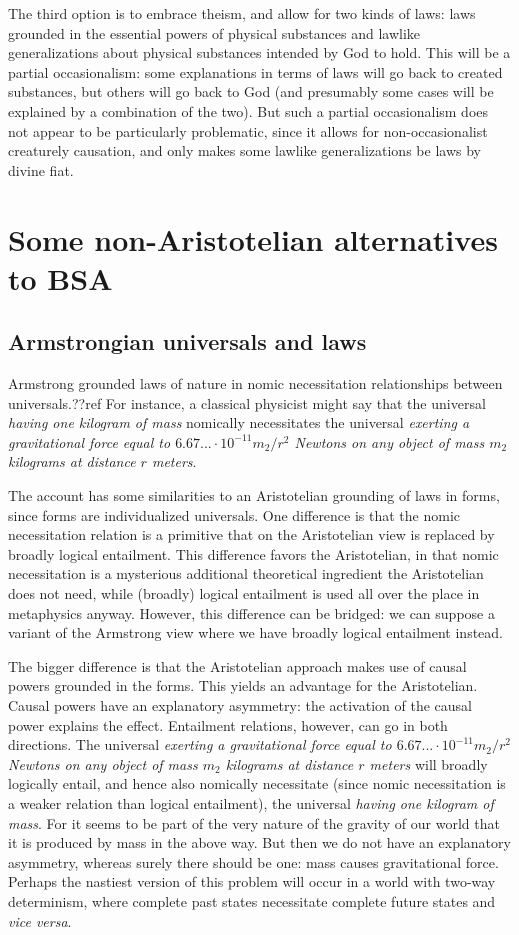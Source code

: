 The third option is to embrace theism, and allow for two kinds of laws: laws grounded in the essential powers of physical substances
and lawlike generalizations about physical substances intended by God to hold. This will be a partial occasionalism: some explanations
in terms of laws will go back to created substances, but others will go back to God (and presumably some cases will be explained by
a combination of the two). But such a partial occasionalism does not appear to be particularly problematic, since it
allows for non-occasionalist creaturely causation, and only makes some lawlike generalizations be laws by divine
fiat.

\section{Some non-Aristotelian alternatives to BSA}
\subsection{Armstrongian universals and laws}
Armstrong grounded laws of nature in nomic necessitation relationships between universals.??ref For instance, 
a classical physicist might say that the universal
\textit{having one kilogram of mass} nomically necessitates the universal \textit{exerting a gravitational
force equal to $6.67... \cdot 10^{-11} m_2/r^2$ Newtons on any object of mass $m_2$ kilograms at 
distance $r$ meters}. 

The account has some similarities to an Aristotelian grounding of laws in 
forms, since forms are individualized universals. One difference is that the nomic necessitation relation
is a primitive that on the Aristotelian view is replaced by broadly logical entailment. This difference
favors the Aristotelian, in that nomic necessitation is a mysterious additional theoretical ingredient the
Aristotelian does not need, while (broadly) logical entailment is used all over the place in metaphysics
anyway. However, this
difference can be bridged: we can suppose a variant of the Armstrong view where we have broadly logical
entailment instead.

The bigger difference is that the Aristotelian
approach makes use of causal powers grounded in the forms. This yields an advantage for the Aristotelian.
Causal powers have an explanatory asymmetry: the activation of the causal power explains the effect. 
Entailment relations, however, can go in both directions. The universal \textit{exerting a gravitational
force equal to $6.67... \cdot 10^{-11} m_2/r^2$ Newtons on any object of mass $m_2$ kilograms at 
distance $r$ meters} will broadly logically entail, and hence also nomically necessitate (since nomic
necessitation is a weaker relation than logical entailment), the universal \textit{having one kilogram of mass}.
For it seems to be part of the very nature of the gravity of our world that it is produced by mass in the
above way. But then we do not have an explanatory asymmetry, whereas surely there should be one: mass causes
gravitational force. Perhaps the nastiest version of this problem will occur in a world with two-way determinism, where 
complete past states necessitate complete future states and \textit{vice versa}. 

